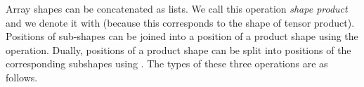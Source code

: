 Array shapes can be concatenated as lists.  We call this operation
\emph{shape product} and we denote it with  (because this
corresponds to the shape of tensor product).  Positions of sub-shapes
can be joined into a position of a product shape using the 
operation.  Dually, positions of a product shape can be split into
positions of the corresponding subshapes using .  The types
of these three operations are as follows.
